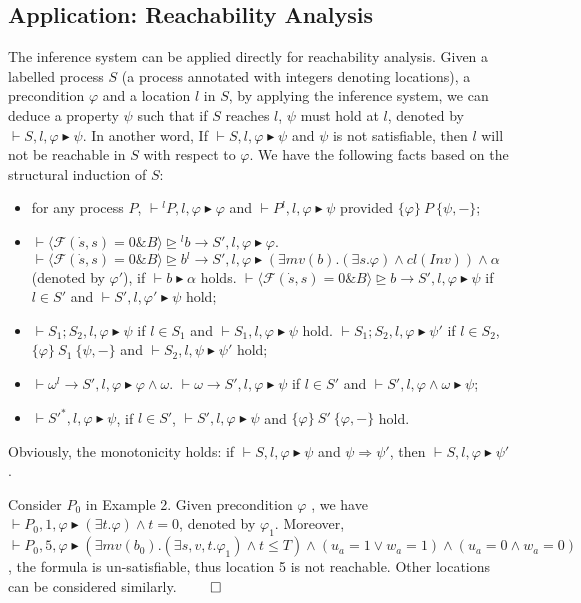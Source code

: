 \documentclass{llncs}
\newcommand{\evolution}[3]{\langle \mathcal{#1}(\dot{#2},#2)=0 \& #3\rangle}
\newcommand{\bexempt}[3]{#1 \unrhd #2 \rightarrow #3}
\newcommand{\typeb}[2]{\vdash #1 \blacktriangleright #2}
\newcommand{\inference}[3]{\{#1\} \ #2\ \{#3\}}
\newcommand{\close}[1]{cl(#1)}
\newcommand{\Pre}{\varphi}
\newcommand{\Post}{\psi}
\begin{document}
\subsection{Application: Reachability Analysis}
\label{subsection:reachability}
The inference system can be applied directly for reachability analysis.
Given a labelled process $S$ (a process annotated with integers denoting locations), a precondition $\Pre$ and a location $l$ in $S$, by applying the inference system,
we can deduce a property  $ \psi$ such that if $S$ reaches $l$, $\psi$ must hold at $l$, denoted by
$\typeb{S, l, \Pre}{\psi}$. In another word, If $\typeb{S, l, \Pre}{\psi}$  and $\psi$ is not satisfiable, then $l$
will not be reachable in $S$  with respect to $\Pre$.
We have the following facts based on the structural induction of $S$:
\begin{itemize}
  \item for any process $P$, $\typeb{{}^l P, l, \Pre}{\Pre}$ and $\typeb{P{}^l, l, \Pre}{\Post}$ provided $\inference{\Pre}{P}{\Post, -}$;
  \item $\typeb{\bexempt{\evolution{F}{s}{B}}{{}^lb}{S'}, l, \Pre}{\Pre}$.
  $\typeb{\bexempt{\evolution{F}{s}{B}}{b{}^l}{S'}, l, \Pre}{(\exists mv(b).(\exists s.\Pre) \wedge \close{Inv}) \wedge \alpha}$ (denoted by $\Pre'$), if  $\typeb{b}{\alpha}$ holds.  $\typeb{\bexempt{\evolution{F}{s}{B}}{b}{S'}, l, \Pre}{\psi} $ if $l \in S'$ and  $\typeb{S', l, \Pre'}{\psi}$ hold;
 \item $\typeb{S_1; S_2, l, \Pre}{\psi} $ if $l \in S_1$ and $ \typeb{S_1, l, \Pre}{\psi}$ hold.
 $\typeb{S_1; S_2, l, \Pre}{\psi'} $ if $l \in S_2$,  $\inference{\Pre}{S_1}{\Post, -}$ and $ \typeb{S_2, l, \Post}{\psi'}$ hold;
     \item   $\typeb{ \omega{}^l \rightarrow S', l, \Pre}{\Pre \wedge\omega}$. $\typeb{ \omega\rightarrow S', l, \Pre}{\psi}$ if $l\in S'$ and $\typeb{S', l, \Pre \wedge \omega}{\psi}$;
  \item $\typeb{S'^*, l, \Pre}{\psi}$, if $l\in S'$, $\typeb{S', l, \Pre} {\psi}$ and $\inference{\Pre}{S'}{\Pre, -}$ hold.
\end{itemize}
Obviously, the monotonicity  holds: if $\typeb{S, l, \Pre}{\psi}$ and $\psi \Rightarrow \psi'$, then $\typeb{S, l, \Pre}{\psi'}$.



\example
Consider $P_0$ in Example 2. Given precondition $\Pre$ , we have
$\typeb{P_0, 1, \Pre} {(\exists t. \Pre) \wedge t=0}$,
denoted by $\Pre_1$. Moreover,
$\typeb{P_0, 5, \Pre}{ (\exists mv(b_0). (\exists s, v, t. \Pre_1) \wedge t\leq T) \wedge (u_a=1 \vee w_a=1)
\wedge (u_a=0 \wedge w_a=0)}$, the formula  is un-satisfiable, thus location 5 is not reachable.
Other locations can be considered similarly. $\qed$
\end{document}
